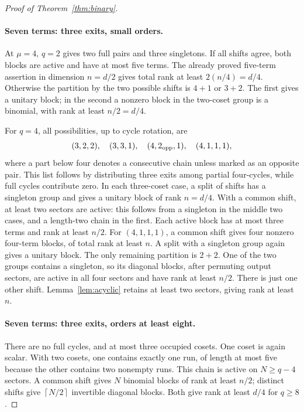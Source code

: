 \documentclass[11pt,a4paper]{article}
\theoremstyle{remark}\newtheorem{remark}[theorem]{Remark}
\newcommand{\ceil}[1]{\left\lceil #1\right\rceil}
\begin{document}
\begin{proof}[Proof of Theorem~\ref{thm:binary}]
\paragraph{Seven terms: three exits, small orders.}
At $\mu=4$, $q=2$ gives two full pairs and three singletons. If all shifts agree, both blocks are active and have at most five terms. The already proved five-term assertion in dimension $n=d/2$ gives total rank at least $2(n/4)=d/4$. Otherwise the partition by the two possible shifts is $4+1$ or $3+2$. The first gives a unitary block; in the second a nonzero block in the two-coset group is a binomial, with rank at least $n/2=d/4$.

For $q=4$, all possibilities, up to cycle rotation, are
\[
 (3,2,2),\quad (3,3,1),\quad (4,2_{\rm opp},1),\quad (4,1,1,1),
\]
where a part below four denotes a consecutive chain unless marked as an opposite pair. This list follows by distributing three exits among partial four-cycles, while full cycles contribute zero.
In each three-coset case, a split of shifts has a singleton group and gives a unitary block of rank $n=d/4$. With a common shift, at least two sectors are active: this follows from a singleton in the middle two cases, and a length-two chain in the first. Each active block has at most three terms and rank at least $n/2$.
For $(4,1,1,1)$, a common shift gives four nonzero four-term blocks, of total rank at least $n$. A split with a singleton group again gives a unitary block. The only remaining partition is $2+2$. One of the two groups contains a singleton, so its diagonal blocks, after permuting output sectors, are active in all four sectors and have rank at least $n/2$. There is just one other shift. Lemma~\ref{lem:acyclic} retains at least two sectors, giving rank at least $n$.

\paragraph{Seven terms: three exits, orders at least eight.}
There are no full cycles, and at most three occupied cosets. One coset is again scalar. With two cosets, one contains exactly one run, of length at most five because the other contains two nonempty runs. This chain is active on $N\ge q-4$ sectors. A common shift gives $N$ binomial blocks of rank at least $n/2$; distinct shifts give $\ceil{N/2}$ invertible diagonal blocks. Both give rank at least $d/4$ for $q\ge8$.


\end{proof}
\end{document}
